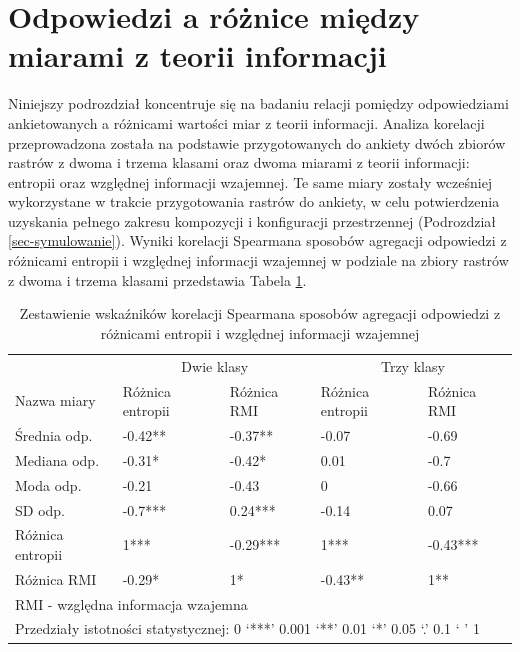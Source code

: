 \documentclass{amuthesis}
\begin{document}
\hypertarget{odpowiedzi-a-ruxf3ux17cnice-miux119dzy-miarami-z-teorii-informacji}{%
\section{Odpowiedzi a różnice między miarami z teorii
informacji}\label{odpowiedzi-a-ruxf3ux17cnice-miux119dzy-miarami-z-teorii-informacji}}

Niniejszy podrozdział koncentruje się na badaniu relacji pomiędzy
odpowiedziami ankietowanych a różnicami wartości miar z teorii
informacji. Analiza korelacji przeprowadzona została na podstawie
przygotowanych do ankiety dwóch zbiorów rastrów z dwoma i trzema klasami
oraz dwoma miarami z teorii informacji: entropii oraz względnej
informacji wzajemnej. Te same miary zostały wcześniej wykorzystane w
trakcie przygotowania rastrów do ankiety, w celu potwierdzenia uzyskania
pełnego zakresu kompozycji i konfiguracji przestrzennej (Podrozdział
\ref{sec-symulowanie}). Wyniki korelacji Spearmana sposobów agregacji
odpowiedzi z różnicami entropii i względnej informacji wzajemnej w
podziale na zbiory rastrów z dwoma i trzema klasami przedstawia Tabela
\ref{tbl-mc2_signif_table}.

\hypertarget{tbl-mc2_signif_table}{}
\begin{table}
\caption{\label{tbl-mc2_signif_table}Zestawienie wskaźników korelacji Spearmana sposobów agregacji odpowiedzi
z różnicami entropii i względnej informacji wzajemnej }\tabularnewline

\centering
\begin{tabular}{lllll}
\toprule
\multicolumn{1}{c}{ } & \multicolumn{2}{c}{Dwie klasy} & \multicolumn{2}{c}{Trzy klasy} \\
\cmidrule(l{3pt}r{3pt}){2-3} \cmidrule(l{3pt}r{3pt}){4-5}
Nazwa miary & Różnica entropii & Różnica RMI & Różnica entropii & Różnica RMI\\
\midrule
Średnia odp. & -0.42** & -0.37** & -0.07 & -0.69\\
Mediana odp. & -0.31* & -0.42* & 0.01 & -0.7\\
Moda odp. & -0.21 & -0.43 & 0 & -0.66\\
SD odp. & -0.7*** & 0.24*** & -0.14 & 0.07\\
Różnica entropii & 1*** & -0.29*** & 1*** & -0.43***\\
\addlinespace
Różnica RMI & -0.29* & 1* & -0.43** & 1**\\
\bottomrule
\multicolumn{5}{l}{\rule{0pt}{1em}RMI - względna informacja wzajemna}\\
\multicolumn{5}{l}{\rule{0pt}{1em}Przedziały istotności statystycznej:  0 ‘***’ 0.001 ‘**’ 0.01 ‘*’ 0.05 ‘.’ 0.1 ‘ ’ 1}\\
\end{tabular}
\end{table}
\end{document}
